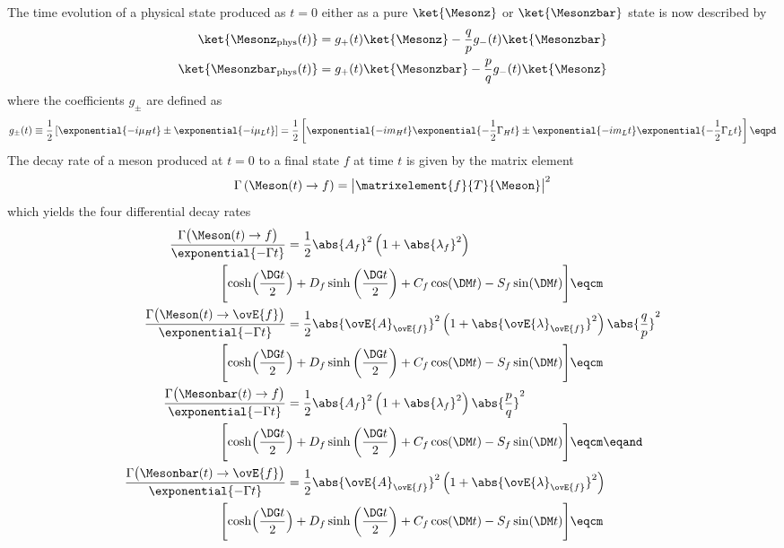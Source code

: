 The time evolution of a physical state produced as $t=0$ either as a pure
$\ket{\Mesonz}$ or $\ket{\Mesonzbar}$ state is now described by
%
\begin{equation}
  \begin{split}
    \ket{\Mesonz_{\text{phys}} (t)}    &= g_{+}(t) \ket{\Mesonz}    - \frac{q}{p} g_{-}(t) \ket{\Mesonzbar} \\
    \ket{\Mesonzbar_{\text{phys}} (t)} &= g_{+}(t) \ket{\Mesonzbar} - \frac{p}{q} g_{-}(t) \ket{\Mesonz}
  \end{split}
\end{equation}
%
where the coefficients $g_{\pm}$ are defined as
%
\begin{equation}
  g_{\pm}(t) \equiv 
  \frac{1}{2} \left[
    \exponential{-i \mu_H t} \pm \exponential{-i \mu_L t}
  \right]
  =
  \frac{1}{2} \left[
    \exponential{-i m_H t} \exponential{-\frac{1}{2} \Gamma_H t} \pm \exponential{-i m_L t} \exponential{-\frac{1}{2} \Gamma_L t}
  \right]\eqpd
\end{equation}
%
The decay rate of a meson produced at $t=0$ to a final state $f$ at time $t$
is given by the matrix element
%
\begin{equation}
  \Gamma \left(\Meson(t)\to f\right)= \bigl\vert \matrixelement{f}{T}{\Meson} \bigr\vert^2
\end{equation}
%
which yields the four differential decay rates  
%
\begin{equation}\label{eq:cpv_theory:flavour_physics:time_evolution:differential_decay_rates}
  \begin{split}
    \frac{\Gamma \bigl(\Meson   (t) \to       f \bigr)}{\exponential{-\Gamma t}} &= 
      \frac{1}{2} \abs{A_f}^2 \left( 1 + \abs{\lambda_f}^2 \right) \\
        \Biggl[ \cosh\Bigl(\frac{\DG t}{2}&\Bigr) + D_f \sinh\left(\frac{\DG t}{2}\right) + C_f \cos(\DM t) - S_f \sin(\DM t) \Biggr]\eqcm \\
    \frac{\Gamma \bigl(\Meson   (t) \to \ovE{f} \bigr)}{\exponential{-\Gamma t}} &= 
      \frac{1}{2} \abs{\ovE{A}_{\ovE{f}}}^2 \left( 1 + \abs{\ovE{\lambda}_{\ovE{f}}}^2 \right) \abs{\frac{q}{p}}^2 \\
        \Biggl[ \cosh\Bigl(\frac{\DG t}{2}&\Bigr) + D_f \sinh\left(\frac{\DG t}{2}\right) + C_f \cos(\DM t) - S_f \sin(\DM t) \Biggr]\eqcm \\
    \frac{\Gamma \bigl(\Mesonbar(t) \to       f \bigr)}{\exponential{-\Gamma t}} &= 
      \frac{1}{2} \abs{A_f}^2 \left( 1 + \abs{\lambda_f}^2 \right) \abs{\frac{p}{q}}^2 \\
        \Biggl[ \cosh\Bigl(\frac{\DG t}{2}&\Bigr) + D_f \sinh\left(\frac{\DG t}{2}\right) + C_f \cos(\DM t) - S_f \sin(\DM t) \Biggr]\eqcm\eqand \\
    \frac{\Gamma \bigl(\Mesonbar(t) \to \ovE{f} \bigr)}{\exponential{-\Gamma t}} &= 
      \frac{1}{2} \abs{\ovE{A}_{\ovE{f}}}^2 \left( 1 + \abs{\ovE{\lambda}_{\ovE{f}}}^2 \right) \\
        \Biggl[ \cosh\Bigl(\frac{\DG t}{2}&\Bigr) + D_f \sinh\left(\frac{\DG t}{2}\right) + C_f \cos(\DM t) - S_f \sin(\DM t) \Biggr]\eqcm \\
  \end{split}
\end{equation}
